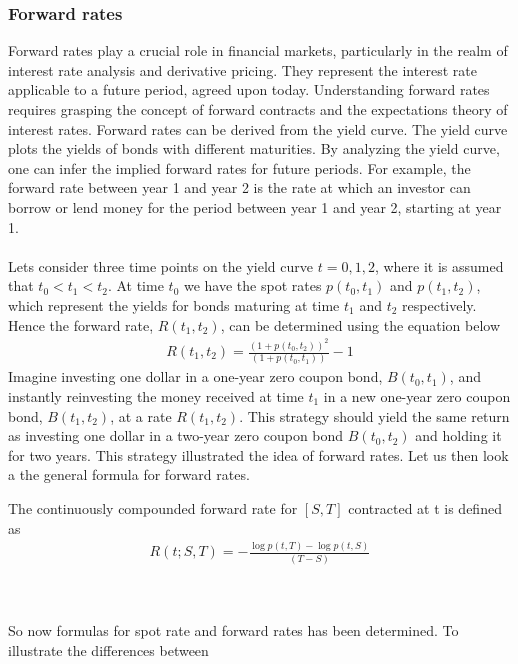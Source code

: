 \subsubsection{Forward rates}
Forward rates play a crucial role in financial markets, particularly in the realm of interest rate analysis and 
derivative pricing. They represent the interest rate applicable to a future period, agreed upon today.
Understanding forward rates requires grasping the concept of forward contracts and the expectations theory of interest rates.
Forward rates can be derived from the yield curve. The yield curve plots the yields of bonds with different maturities.
By analyzing the yield curve, one can infer the implied forward rates for future periods. For example, 
the forward rate between year 1 and year 2 is the rate at which an investor can borrow or lend money for the period
between year 1 and year 2, starting at year 1.
\\\\
Lets consider three time points on the yield curve $t=0,1,2$, where it is assumed
that $t_0 < t_1 < t_2$. At time $t_0$ we have the spot rates $p(t_0,t_1)$ and $p(t_1,t_2)$,
which represent the yields for bonds maturing at time $t_1$ and $t_2$ respectively.
Hence the forward rate, $R(t_1,t_2)$, can be determined using the equation below \cite{Bjork}
\begin{align*}
    R(t_1,t_2)= \frac{(1+p(t_0,t_2))^2}{(1+p(t_0,t_1))}-1
\end{align*}
Imagine investing one dollar in a one-year zero coupon bond, $B(t_0,t_1)$,
and instantly reinvesting the money received at time $t_1$ in a new one-year zero coupon bond,
$B(t_1,t_2)$, at a rate $R(t_1,t_2)$. This strategy should yield the same return as investing 
one dollar in a two-year zero coupon bond $B(t_0,t_2)$ and holding it for two years. 
This strategy illustrated the idea of forward rates. Let us then look a the general
formula for forward rates. 
\begin{definition}\label{def:forward}
    The continuously compounded forward rate for $[S,T]$ contracted at t is defined
    as \cite{Bjork} 
    \begin{align*}
        R(t;S,T)= - \frac{\log p(t,T)- \log p(t,S)}{(T-S)} 
    \end{align*}
\end{definition} 
\noindent
\\\\
So now formulas for spot rate and forward rates has been determined. To illustrate the differences between 
